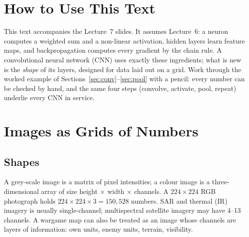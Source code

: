 \documentclass[11pt]{article}
\begin{document}
\tableofcontents
\newpage

\section{How to Use This Text}
This text accompanies the Lecture~7 slides. It assumes Lecture~6: a neuron computes a weighted sum and a non-linear activation, hidden layers learn feature maps, and backpropagation computes every gradient by the chain rule. A convolutional neural network (CNN) uses exactly these ingredients; what is new is the \emph{shape} of its layers, designed for data laid out on a grid. Work through the worked example of Sections~\ref{sec:conv}--\ref{sec:pool} with a pencil: every number can be checked by hand, and the same four steps (convolve, activate, pool, repeat) underlie every CNN in service.

\section{Images as Grids of Numbers}
\subsection{Shapes}
A grey-scale image is a matrix of pixel intensities; a colour image is a three-dimensional array of size height $\times$ width $\times$ channels. A $224\times224$ RGB photograph holds $224\times224\times3=150{,}528$ numbers. SAR and thermal (IR) imagery is usually single-channel; multispectral satellite imagery may have 4--13 channels. A wargame map can also be treated as an image whose channels are layers of information: own units, enemy units, terrain, visibility.
\end{document}
